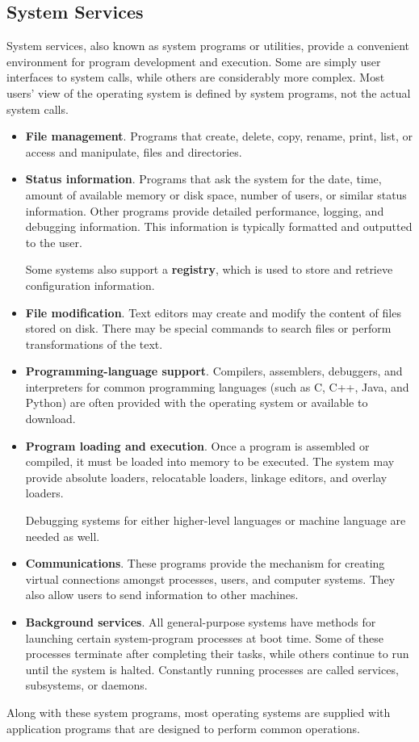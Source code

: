 \documentclass{article}
\begin{document}
\subsection{System Services}
System services, also known as system programs or utilities, provide a
convenient environment for program development and execution. Some are
simply user interfaces to system calls, while others are considerably
more complex. Most users' view of the operating system is defined by
system programs, not the actual system calls.
\begin{itemize}
    \item \textbf{File management}.
          Programs that create, delete, copy, rename, print, list, or
          access and manipulate, files and directories.
    \item \textbf{Status information}.
          Programs that ask the system for the date, time, amount of
          available memory or disk space, number of users, or similar
          status information.
          Other programs provide detailed performance, logging, and
          debugging information.
          This information is typically formatted and outputted to the
          user.

          Some systems also support a \textbf{registry}, which is used
          to store and retrieve configuration information.
    \item \textbf{File modification}.
          Text editors may create and modify the content of files
          stored on disk.
          There may be special commands to search files or perform
          transformations of the text.
    \item \textbf{Programming-language support}.
          Compilers, assemblers, debuggers, and interpreters for common
          programming languages (such as C, C++, Java, and Python) are
          often provided with the operating system or available to
          download.
    \item \textbf{Program loading and execution}.
          Once a program is assembled or compiled, it must be loaded
          into memory to be executed.
          The system may provide absolute loaders, relocatable loaders,
          linkage editors, and overlay loaders.

          Debugging systems for either higher-level languages or
          machine language are needed as well.
    \item \textbf{Communications}.
          These programs provide the mechanism for creating virtual
          connections amongst processes, users, and computer systems.
          They also allow users to send information to other machines.
    \item \textbf{Background services}.
          All general-purpose systems have methods for launching
          certain system-program processes at boot time.
          Some of these processes terminate after completing their
          tasks, while others continue to run until the system is
          halted.
          Constantly running processes are called services, subsystems,
          or daemons.
\end{itemize}
Along with these system programs, most operating systems are supplied
with application programs that are designed to perform common
operations.
\end{document}
